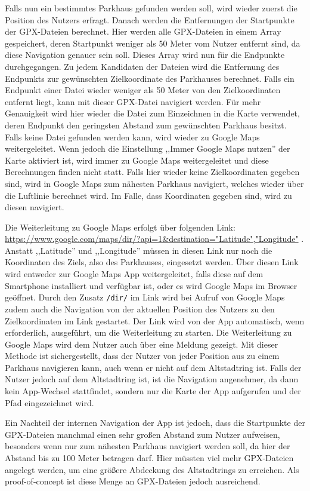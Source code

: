 Falls nun ein bestimmtes Parkhaus gefunden werden soll, wird wieder zuerst die Position des Nutzers erfragt. Danach werden die Entfernungen der Startpunkte der GPX-Dateien berechnet. Hier werden alle GPX-Dateien in einem Array gespeichert, deren Startpunkt weniger als 50 Meter vom Nutzer entfernt sind, da diese Navigation genauer sein soll. Dieses Array wird nun für die Endpunkte durchgegangen. Zu jedem Kandidaten der Dateien wird die Entfernung des Endpunkts zur gewünschten Zielkoordinate des Parkhauses berechnet. Falls ein Endpunkt einer Datei wieder weniger als 50 Meter von den Zielkoordinaten entfernt liegt, kann mit dieser GPX-Datei navigiert werden. Für mehr Genauigkeit wird hier wieder die Datei zum Einzeichnen in die Karte verwendet, deren Endpunkt den geringsten Abstand zum gewünschten Parkhaus besitzt. Falls keine Datei gefunden werden kann, wird wieder zu Google Maps weitergeleitet. Wenn jedoch die Einstellung ,,Immer Google Maps nutzen'' der Karte aktiviert ist, wird immer zu Google Maps weitergeleitet und diese Berechnungen finden nicht statt. Falls hier wieder keine Zielkoordinaten gegeben sind, wird in Google Maps zum nähesten Parkhaus navigiert, welches wieder über die Luftlinie berechnet wird. Im Falle, dass Koordinaten gegeben sind, wird zu diesen navigiert.

Die Weiterleitung zu Google Maps erfolgt über folgenden Link: \url{https://www.google.com/maps/dir/?api=1&destination="Latitude","Longitude"} \cite{MapsLinks}. Anstatt ,,Latitude'' und ,,Longitude'' müssen in diesen Link nur noch die Koordinaten des Ziels, also des Parkhauses, eingesetzt werden. Über diesen Link wird entweder zur Google Maps App weitergeleitet, falls diese auf dem Smartphone installiert und verfügbar ist, oder es wird Google Maps im Browser geöffnet. Durch den Zusatz \verb|/dir/| im Link wird bei Aufruf von Google Maps zudem auch die Navigation von der aktuellen Position des Nutzers zu den Zielkoordinaten im Link gestartet. Der Link wird von der App automatisch, wenn erforderlich, ausgeführt, um die Weiterleitung zu starten. Die Weiterleitung zu Google Maps wird dem Nutzer auch über eine Meldung gezeigt. Mit dieser Methode ist sichergestellt, dass der Nutzer von jeder Position aus zu einem Parkhaus navigieren kann, auch wenn er nicht auf dem Altstadtring ist. Falls der Nutzer jedoch auf dem Altstadtring ist, ist die Navigation angenehmer, da dann kein App-Wechsel stattfindet, sondern nur die Karte der App aufgerufen und der Pfad eingezeichnet wird.

Ein Nachteil der internen Navigation der App ist jedoch, dass die Startpunkte der GPX-Dateien manchmal einen sehr großen Abstand zum Nutzer aufweisen, besonders wenn nur zum nähesten Parkhaus navigiert werden soll, da hier der Abstand bis zu 100 Meter betragen darf. Hier müssten viel mehr GPX-Dateien angelegt werden, um eine größere Abdeckung des Altstadtrings zu erreichen. Als proof-of-concept ist diese Menge an GPX-Dateien jedoch ausreichend.

